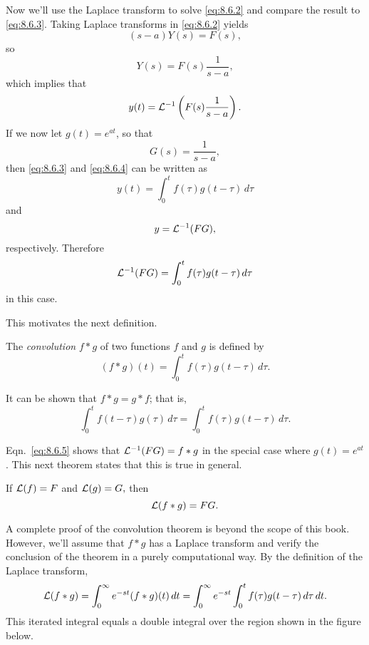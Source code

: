 \documentclass{ximera}
\begin{document}
Now we'll use the Laplace transform to solve \eqref{eq:8.6.2}
and compare the result to \eqref{eq:8.6.3}. Taking Laplace transforms in
\eqref{eq:8.6.2} yields
$$
(s-a)Y(s)=F(s),
$$
so
$$
Y(s)=F(s) \frac{1}{s-a},
$$
which implies that
\begin{equation}\label{eq:8.6.4}
y(t)= {\cal L}^{-1}\left(F(s)\frac{1}{s-a}\right).
\end{equation}
If we now let $g(t)=e^{at}$, so that
$$
G(s)=\frac{1}{s-a},
$$
then \eqref{eq:8.6.3} and \eqref{eq:8.6.4} can be written as
$$
y(t)=\int_0^tf(\tau)g(t-\tau)\,d\tau
$$
and
$$
y={\cal L}^{-1}(FG),
$$
respectively.  Therefore
\begin{equation}\label{eq:8.6.5}
{\cal L}^{-1}(FG)=\int_0^t f(\tau)g(t-\tau)\,d\tau
\end{equation}
in this case.

This motivates  the next definition.

\begin{definition}\label{thmtype:8.6.1}
The \textit{convolution} $f\ast g$ of two functions $f$
and $g$ is defined by
$$
(f\ast g)(t)=\int_0^t f(\tau)g(t-\tau)\,d\tau.
$$
\end{definition}

It can be shown %
that $f\ast g=g\ast f$;   that
is,
$$
\int_0^tf(t-\tau)g(\tau)\,d\tau=\int_0^tf(\tau)g(t-\tau)\,d\tau.
$$

Eqn.~\eqref{eq:8.6.5} shows that ${\cal L}^{-1}(FG)=f\ast g$ in the special
case where $g(t)=e^{at}$. This next theorem states that this is
true in general.

\begin{theorem}\label{thmtype:8.6.2}
If ${\cal L}(f)=F$  and ${\cal L}(g)=G,$ then
$$
{\cal L}(f\ast g)=FG.
$$
\end{theorem}

A complete proof of the convolution theorem is beyond the scope of
this book. However, we'll assume that $f\ast g$ has a Laplace
transform and verify the conclusion of the theorem in a purely
computational way. By the definition of the Laplace transform,
$$
{\cal L}(f\ast g)=\int_0^\infty e^{-st}(f\ast g)(t)\,dt=\int_0^\infty
e^{-st}
\int_0^t f(\tau)g(t-\tau)\,d\tau\,dt.
$$
This iterated integral equals a double integral over the region shown
in %
the figure below.

\begin{center}
\end{center}
\end{document}
